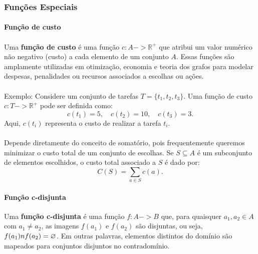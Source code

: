 \documentclass[12pt,a4paper]{article}
\def\cap{\string n}%
\def\to{->}%
\begin{document}
\subsubsection{Funções Especiais}

\paragraph{Função de custo}
\paragraph{}Uma \textbf{função de custo} é uma função \(c: A \to \mathbb{R}^+\) que atribui um valor numérico não negativo (custo) a cada elemento de um conjunto \(A\). Essas funções são amplamente utilizadas em otimização, economia e teoria dos grafos para modelar despesas, penalidades ou recursos associados a escolhas ou ações.

\paragraph{}
Exemplo: Considere um conjunto de tarefas \(T = \{t_1, t_2, t_3\}\). Uma função de custo \(c: T \to \mathbb{R}^+\) pode ser definida como:
\[c(t_1) = 5, \quad c(t_2) = 10, \quad c(t_3) = 3.\]
Aqui, \(c(t_i)\) representa o custo de realizar a tarefa \(t_i\). 

\paragraph{}
Depende diretamente do conceito de somatório, pois frequentemente queremos minimizar o custo total de um conjunto de escolhas. Se \(S \subseteq A\) é um subconjunto de elementos escolhidos, o custo total associado a \(S\) é dado por:
\[C(S) = \sum_{a \in S} c(a).\] 

\paragraph{Função c-disjunta}
Uma \textbf{função c-disjunta} é uma função \(f: A \to B\) que, para quaisquer \(a_1, a_2 \in A\) com \(a_1 \neq a_2\), as imagens \(f(a_1)\) e \(f(a_2)\) são disjuntas, ou seja, \(f(a_1) \cap f(a_2) = \varnothing\). Em outras palavras, elementos distintos do domínio são mapeados para conjuntos disjuntos no contradomínio.
\end{document}
